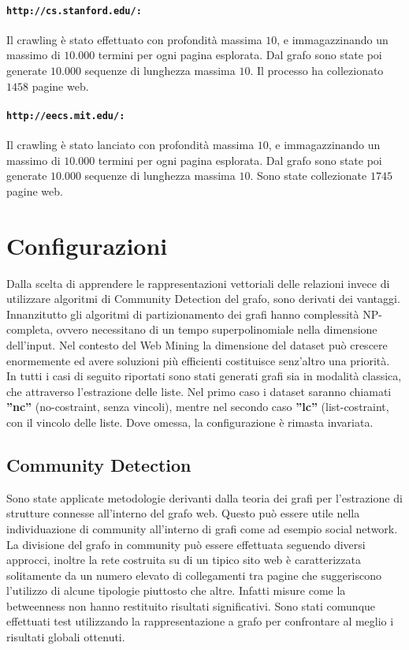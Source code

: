 \paragraph{\texttt{http://cs.stanford.edu/:}}
 Il crawling è stato effettuato con profondità massima $10$, e immagazzinando un massimo di $10.000$ termini per ogni pagina esplorata. Dal grafo sono state poi generate $10.000$ sequenze di lunghezza massima $10$. Il processo ha collezionato $1458$ pagine web.

\paragraph{\texttt{http://eecs.mit.edu/:}}
Il crawling è stato lanciato con profondità massima $10$, e immagazzinando un massimo di $10.000$ termini per ogni pagina esplorata. Dal grafo sono state poi generate $10.000$ sequenze di lunghezza massima $10$. Sono state collezionate $1745$ pagine web.

\section{Configurazioni}
Dalla scelta di apprendere le rappresentazioni vettoriali delle relazioni invece di utilizzare algoritmi di Community Detection del grafo, sono derivati dei vantaggi. Innanzitutto gli algoritmi di partizionamento dei grafi hanno complessità NP-completa, ovvero necessitano di un tempo superpolinomiale nella dimensione dell'input. Nel contesto del Web Mining la dimensione del dataset può crescere enormemente ed avere soluzioni più efficienti costituisce senz'altro una priorità. 
\\
In tutti i casi di seguito riportati sono stati generati grafi sia in modalità classica, che attraverso l'estrazione delle liste. Nel primo caso i dataset saranno chiamati \textbf{''nc''} (no-costraint, senza vincoli), mentre nel secondo caso \textbf{''lc''} (list-costraint, con il vincolo delle liste. Dove omessa, la configurazione è rimasta invariata.

\subsection{Community Detection}
Sono state applicate metodologie derivanti dalla teoria dei grafi per l'estrazione di strutture connesse all'interno del grafo web. Questo può essere utile nella individuazione di community all'interno di grafi come ad esempio social network. La divisione del grafo in community può essere effettuata seguendo diversi approcci, inoltre la rete costruita su di un tipico sito web è caratterizzata solitamente da un numero elevato di collegamenti tra pagine che suggeriscono l'utilizzo di alcune tipologie piuttosto che altre. Infatti misure come la betweenness non hanno restituito risultati significativi.
Sono stati comunque effettuati test utilizzando la rappresentazione a grafo per confrontare al meglio i risultati globali ottenuti.


